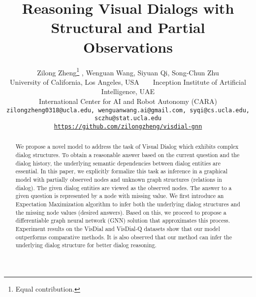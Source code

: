 \documentclass[10pt,twocolumn,letterpaper]{article}
\begin{document}
\title{Reasoning Visual Dialogs with Structural and Partial Observations}

\author{Zilong Zheng\thanks{Equal contribution.} , Wenguan Wang\footnotemark[1] , Siyuan Qi\footnotemark[1] , Song-Chun Zhu\\
\small University of California, Los Angeles, USA~~~~\small Inception Institute of Artificial Intelligence, UAE\\
\small International Center for AI and Robot Autonomy (CARA)\\
{\tt\small zilongzheng0318@ucla.edu, wenguanwang.ai@gmail.com, syqi@cs.ucla.edu, sczhu@stat.ucla.edu}\\
{\tt\small \url{https://github.com/zilongzheng/visdial-gnn}}
}

\maketitle

\thispagestyle{empty}

\begin{abstract}
We propose a novel model to address the task of Visual Dialog which exhibits complex dialog structures. To obtain a reasonable answer based on the current question and the dialog history, the underlying semantic dependencies between dialog entities are essential.
In this paper, we explicitly formalize this task as inference in a graphical model with partially observed nodes and unknown graph structures (relations in dialog). The given dialog entities are viewed as the observed nodes. The answer to a given question is represented by a node with missing value.
We first introduce an Expectation Maximization algorithm to infer both the underlying dialog structures and the missing node values (desired answers). Based on this, we proceed to propose a differentiable graph neural network (GNN) solution that approximates this process.
Experiment results on the VisDial and VisDial-Q datasets show that our model outperforms comparative methods. It is also observed that our method can infer the underlying dialog structure for better dialog reasoning.
\end{abstract}

\vspace{-3pt}
\end{document}
